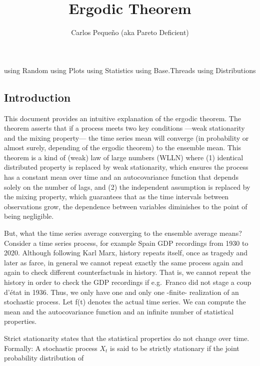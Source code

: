 \documentclass[
]{article}
\title{Ergodic Theorem}
\author{Carlos Pequeño (aka Pareto Deficient)}
\date{}
\newenvironment{Shaded}{\begin{snugshade}}{\end{snugshade}}
\newcommand{\BuiltInTok}[1]{#1}
\newcommand{\ImportTok}[1]{#1}
\begin{document}
\maketitle

\begin{Shaded}
\begin{Highlighting}[]
\ImportTok{using} \BuiltInTok{Random}
\ImportTok{using} \BuiltInTok{Plots}
\ImportTok{using} \BuiltInTok{Statistics}
\ImportTok{using} \BuiltInTok{Base.Threads}
\ImportTok{using} \BuiltInTok{Distributions}
\end{Highlighting}
\end{Shaded}

\hypertarget{introduction}{%
\subsection{Introduction}\label{introduction}}

This document provides an intuitive explanation of the ergodic theorem.
The theorem asserts that if a process meets two key conditions ---weak
stationarity and the mixing property--- the time series mean will
converge (in probability or almost surely, depending of the ergodic
theorem) to the ensemble mean. This theorem is a kind of (weak) law of
large numbers (WLLN) where (1) identical distributed property is
replaced by weak stationarity, which ensures the process has a constant
mean over time and an autocovariance function that depends solely on the
number of lags, and (2) the independent assumption is replaced by the
mixing property, which guarantees that as the time intervals between
observations grow, the dependence between variables diminishes to the
point of being negligible.

But, what the time series average converging to the ensemble average
means? Consider a time series process, for example Spain GDP recordings
from 1930 to 2020. Although following Karl Marx, history repeats itself,
once as tragedy and later as farce, in general we cannot repeat exactly
the same process again and again to check different counterfactuals in
history. That is, we cannot repeat the history in order to check the GDP
recordings if e.g.~Franco did not stage a coup d'état in 1936. Thus, we
only have one and only one -finite- realization of an stochastic
process. Let f(t) denotes the actual time series. We can compute the
mean and the autocovariance function and an infinite number of
statistical properties.

Strict stationarity states that the statistical properties do not change
over time. Formally: A stochastic process \({X_t}\) is said to be
strictly stationary if the joint probability distribution of
\end{document}
